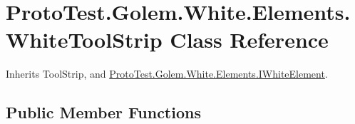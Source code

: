 \hypertarget{class_proto_test_1_1_golem_1_1_white_1_1_elements_1_1_white_tool_strip}{\section{Proto\-Test.\-Golem.\-White.\-Elements.\-White\-Tool\-Strip Class Reference}
\label{class_proto_test_1_1_golem_1_1_white_1_1_elements_1_1_white_tool_strip}
}


Inherits Tool\-Strip, and \hyperlink{interface_proto_test_1_1_golem_1_1_white_1_1_elements_1_1_i_white_element}{Proto\-Test.\-Golem.\-White.\-Elements.\-I\-White\-Element}.

\subsection*{Public Member Functions}
